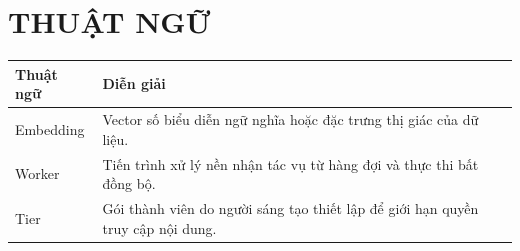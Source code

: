 \chapter*{THUẬT NGỮ}

\begin{table}[H]
\centering
\begin{tabular}{p{}p{}}
\toprule
\textbf{Thuật ngữ} & \textbf{Diễn giải} \\
\midrule
Embedding & Vector số biểu diễn ngữ nghĩa hoặc đặc trưng thị giác của dữ liệu. \\
Worker & Tiến trình xử lý nền nhận tác vụ từ hàng đợi và thực thi bất đồng bộ. \\
Tier & Gói thành viên do người sáng tạo thiết lập để giới hạn quyền truy cập nội dung. \\
\bottomrule
\end{tabular}
\end{table}
